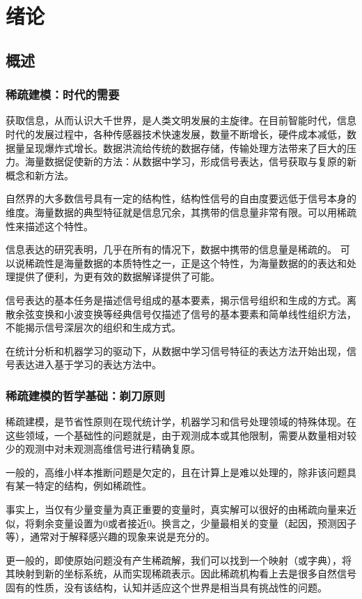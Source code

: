 \chapter{绪论}\label{chap:introduction}

\section{概述}
\subsection{稀疏建模：时代的需要}
获取信息，从而认识大千世界，是人类文明发展的主旋律。在目前智能时代，信息时代的发展过程中，各种传感器技术快速发展，数量不断增长，硬件成本减低，数据量呈现爆炸式增长。数据洪流给传统的数据存储，传输处理方法带来了巨大的压力。海量数据促使新的方法：从数据中学习，形成信号表达，信号获取与复原的新概念和新方法。

自然界的大多数信号具有一定的结构性，结构性信号的自由度要远低于信号本身的维度。海量数据的典型特征就是信息冗余，其携带的信息量非常有限。可以用稀疏性来描述这个特性。

信息表达的研究表明，几乎在所有的情况下，数据中携带的信息量是稀疏的。
可以说稀疏性是海量数据的本质特性之一，正是这个特性，为海量数据的的表达和处理提供了便利，为更有效的数据解译提供了可能。

信号表达的基本任务是描述信号组成的基本要素，揭示信号组织和生成的方式。离散余弦变换和小波变换等经典信号仅描述了信号的基本要素和简单线性组织方法，不能揭示信号深层次的组织和生成方式。

在统计分析和机器学习的驱动下，从数据中学习信号特征的表达方法开始出现，信号表达进入基于学习的表达方法中。

\subsection{稀疏建模的哲学基础：剃刀原则}
稀疏建模，是节省性原则在现代统计学，机器学习和信号处理领域的特殊体现。在这些领域，一个基础性的问题就是，由于观测成本或其他限制，需要从数量相对较少的观测中对未观测高维信号进行精确复原。

一般的，高维小样本推断问题是欠定的，且在计算上是难以处理的，除非该问题具有某一特定的结构，例如稀疏性。

事实上，当仅有少量变量为真正重要的变量时，真实解可以很好的由稀疏向量来近似，将剩余变量设置为0或者接近0。换言之，少量最相关的变量（起因，预测因子等），通常对于解释感兴趣的现象来说是充分的。

更一般的，即使原始问题没有产生稀疏解，我们可以找到一个映射（或字典），将其映射到新的坐标系统，从而实现稀疏表示。因此稀疏机构看上去是很多自然信号固有的性质，没有该结构，认知并适应这个世界是相当具有挑战性的问题。

